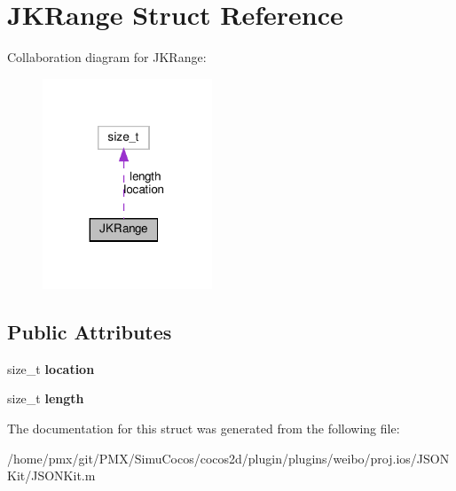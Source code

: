 \hypertarget{structJKRange}{}\section{J\+K\+Range Struct Reference}
\label{structJKRange}


Collaboration diagram for J\+K\+Range\+:
\nopagebreak
\begin{figure}[H]
\begin{center}
\leavevmode
\includegraphics[width=143pt]{structJKRange__coll__graph}
\end{center}
\end{figure}
\subsection*{Public Attributes}
\begin{DoxyCompactItemize}
\item 
\mbox{\label{structJKRange_aef1c09bd06b578b2f7dac97529e061c8}} 
size\+\_\+t {\bfseries location}
\item 
\mbox{\label{structJKRange_ae6422b6a24aeb2f4c9834ca5543bf1b9}} 
size\+\_\+t {\bfseries length}
\end{DoxyCompactItemize}


The documentation for this struct was generated from the following file\+:\begin{DoxyCompactItemize}
\item 
/home/pmx/git/\+P\+M\+X/\+Simu\+Cocos/cocos2d/plugin/plugins/weibo/proj.\+ios/\+J\+S\+O\+N\+Kit/J\+S\+O\+N\+Kit.\+m\end{DoxyCompactItemize}
